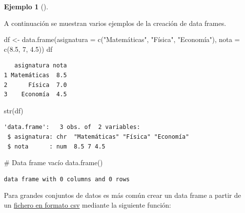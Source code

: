 \documentclass[
  a4paper,
]{scrreport}
\newenvironment{Shaded}{\begin{snugshade}}{\end{snugshade}}
\newcommand{\AttributeTok}[1]{\textcolor[rgb]{0.40,0.45,0.13}{#1}}
\newcommand{\CommentTok}[1]{\textcolor[rgb]{0.37,0.37,0.37}{#1}}
\newcommand{\DecValTok}[1]{\textcolor[rgb]{0.68,0.00,0.00}{#1}}
\newcommand{\FloatTok}[1]{\textcolor[rgb]{0.68,0.00,0.00}{#1}}
\newcommand{\FunctionTok}[1]{\textcolor[rgb]{0.28,0.35,0.67}{#1}}
\newcommand{\NormalTok}[1]{\textcolor[rgb]{0.00,0.23,0.31}{#1}}
\newcommand{\OtherTok}[1]{\textcolor[rgb]{0.00,0.23,0.31}{#1}}
\newcommand{\StringTok}[1]{\textcolor[rgb]{0.13,0.47,0.30}{#1}}
\theoremstyle{definition}
\newtheorem{example}{Ejemplo}[chapter]
\theoremstyle{definition}
\theoremstyle{remark}
\begin{document}
\leavevmode{}%
\begin{example}[]\label{exm-creacion-data-frames}

A continuación se muestran varios ejemplos de la creación de data
frames.

\begin{Shaded}
\begin{Highlighting}[]
\NormalTok{df }\OtherTok{\textless{}{-}} \FunctionTok{data.frame}\NormalTok{(}\AttributeTok{asignatura =} \FunctionTok{c}\NormalTok{(}\StringTok{"Matemáticas"}\NormalTok{, }\StringTok{"Física"}\NormalTok{, }\StringTok{"Economía"}\NormalTok{), }\AttributeTok{nota =} \FunctionTok{c}\NormalTok{(}\FloatTok{8.5}\NormalTok{, }\DecValTok{7}\NormalTok{, }\FloatTok{4.5}\NormalTok{))}
\NormalTok{df}
\end{Highlighting}
\end{Shaded}

\begin{verbatim}
   asignatura nota
1 Matemáticas  8.5
2      Física  7.0
3    Economía  4.5
\end{verbatim}

\begin{Shaded}
\begin{Highlighting}[]
\FunctionTok{str}\NormalTok{(df)}
\end{Highlighting}
\end{Shaded}

\begin{verbatim}
'data.frame':   3 obs. of  2 variables:
 $ asignatura: chr  "Matemáticas" "Física" "Economía"
 $ nota      : num  8.5 7 4.5
\end{verbatim}

\begin{Shaded}
\begin{Highlighting}[]
\CommentTok{\# Data frame vacío}
\FunctionTok{data.frame}\NormalTok{()}
\end{Highlighting}
\end{Shaded}

\begin{verbatim}
data frame with 0 columns and 0 rows
\end{verbatim}

\end{example}

Para grandes conjuntos de datos es más común crear un data frame a
partir de un
\href{https://es.wikipedia.org/wiki/Valores_separados_por_comas}{fichero
en formato csv} mediante la siguiente función:
\end{document}
